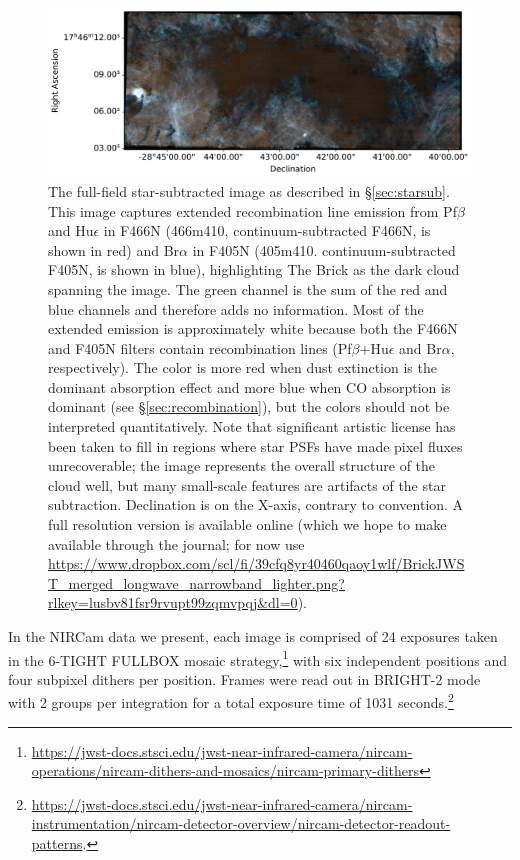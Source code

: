 \documentclass[times,astrosymb,twocolumn]{aastex631}
\newcommand\hue{Hu\ensuremath{\epsilon}\xspace}
\def\rr#1{#1}
\begin{document}
\begin{figure}[htp]
    \centering
    \includegraphics[width=\textwidth]{figures/BrickJWST_merged_longwave_narrowband_lighter_labeledaxes.pdf}
    \caption{The full-field star-subtracted image as described in \S \ref{sec:starsub}.
    This image captures extended recombination line emission from Pf$\beta$ and Hu$\epsilon$ in F466N
    \rr{(466m410, continuum-subtracted F466N, is shown in red) and Br$\alpha$ in F405N (405m410. continuum-subtracted F405N, is shown in blue), highlighting The Brick as the dark cloud spanning the image.}
    \rr{The green channel is the sum of the red and blue channels and therefore adds no information.}
    Most of the \rr{extended emission is approximately white} because both the F466N and F405N filters contain recombination lines (Pf$\beta$+\hue and Br$\alpha$, respectively).
    The color is \rr{more red} when dust extinction is the dominant absorption effect and \rr{more blue} when CO absorption is dominant (see \S \ref{sec:recombination})\rr{, but the colors should not be interpreted quantitatively}.
    Note that significant artistic license has been taken to fill in regions where star PSFs have made pixel fluxes unrecoverable; the image represents the overall structure of the cloud well, but many small-scale features are artifacts of the star subtraction.
    Declination is on the X-axis, contrary to convention.
    A full resolution version is available online
    (which we hope to make available through the journal; for now use \url{https://www.dropbox.com/scl/fi/39cfq8yr40460qaoy1wlf/BrickJWST_merged_longwave_narrowband_lighter.png?rlkey=lusbv81fsr9rvupt99zqmvpqj&dl=0}).
    }
    \label{fig:fullfieldstarless}
\end{figure}

In the NIRCam data we present, each image is comprised of 24 exposures taken in the 6-TIGHT FULLBOX mosaic strategy,\footnote{\url{https://jwst-docs.stsci.edu/jwst-near-infrared-camera/nircam-operations/nircam-dithers-and-mosaics/nircam-primary-dithers}} with \rr{six} independent positions and \rr{four} subpixel dithers per position.
Frames were read out in BRIGHT-2 mode with 2 groups per integration for a total exposure time of 1031 seconds.\footnote{\url{https://jwst-docs.stsci.edu/jwst-near-infrared-camera/nircam-instrumentation/nircam-detector-overview/nircam-detector-readout-patterns}.}
\end{document}
